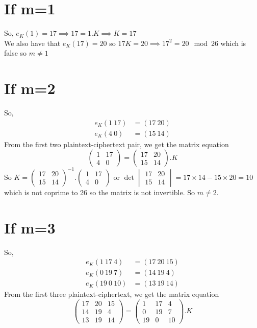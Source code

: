 \documentclass[12pt,a4paper]{article}
\begin{document}
\section*{If m=1}
So, $e_K(1)=17\implies 17=1.K\implies K=17$\\
We also have that $e_K(17)=20$ so $17K=20\implies 17^2=20\mod 26$ which is false so $m\neq 1$

\section*{If m=2}
So, 
\begin{align}
e_K(1~17)&=(17~20)\\
e_K(4~0)&=(15~14)
\end{align}
From the first two plaintext-ciphertext pair, we get the matrix equation 
\[\begin{pmatrix}
1&17\\4&0
\end{pmatrix}=\begin{pmatrix}
17&20\\15&14
\end{pmatrix}.K\]
So $K=\begin{pmatrix}
	17&20\\15&14
\end{pmatrix}^{-1}.\begin{pmatrix}
1&17\\4&0
\end{pmatrix}$ or $\det\begin{vmatrix}
17&20\\15&14
\end{vmatrix}=17\times 14-15\times 20=10$ which is not coprime to 26 so the matrix is not invertible. So $m\neq 2$.

\section*{If m=3}
So, 
\begin{align}
	e_K(1~17~4)&=(17~20~15)\\
	e_K(0~19~7)&=(14~19~4)\\
	e_K(19~0~10)&=(13~19~14)
\end{align}
From the first three plaintext-ciphertext, we get the matrix equation 
\[\begin{pmatrix}
	17&20&15\\14&19&4\\13&19&14
\end{pmatrix}=\begin{pmatrix}
	1&17&4\\0&19&7\\19&0&10
\end{pmatrix}.K\]
\end{document}
